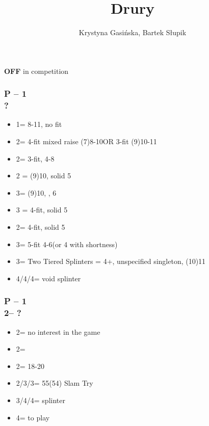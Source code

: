\documentclass[12pt, a4paper]{article}
\title{Drury}
\author{Krystyna Gasińska, Bartek Słupik}
\begin{document}
\maketitle


{\textbf{OFF}} in competition

\subsubsection*{P -- 1\majs \\ ?}
\begin{itemize}
    \item 1\nt = 8-11, no fit
    \item 2\clubs = 4-fit mixed raise (7)8-10\dps OR 3-fit (9)10-11\dps
    \item 2\majs = 3-fit, 4-8\dps
    \item 2 = (9)10, solid 5
    \item 3\clubs = (9)10, \inv, 6\clubs
    \item 3 = 4-fit, solid 5
    \item 2\nt = 4-fit, solid 5\clubs
    \item 3\majs = 5-fit 4-6\dps (or 4 with shortness)
    \item 3\nt = Two Tiered Splinters = 4+\majs, unspecified singleton, (10)11\dps
    \item 4\clubs/4\diams/4\hearts = void splinter
\end{itemize}

\subsubsection*{P -- 1\hearts \\ 2\clubs -- ?}
\begin{itemize}
    \item 2\hearts = no interest in the game
    \item 2\diams = \inv
    \item 2\nt = 18-20 \bal
    \item 2\spades/3\clubs/3\diams = 55(54) Slam Try
    \item 3\spades/4\clubs/4\diams = splinter
    \item 4\hearts = to play
\end{itemize}
\end{document}

